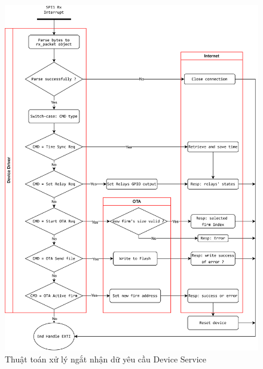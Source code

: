 \begin{figure}[!ht]
    \centering
    \includegraphics[width=1.0\linewidth]{Figures/flowcharts-Device_handle-DS-req.png}
    \caption{Thuật toán xử lý ngắt nhận dữ yêu cầu Device Service}
    \label{fig:flowcharts-Device_handle-DS-req}
\end{figure}
 

